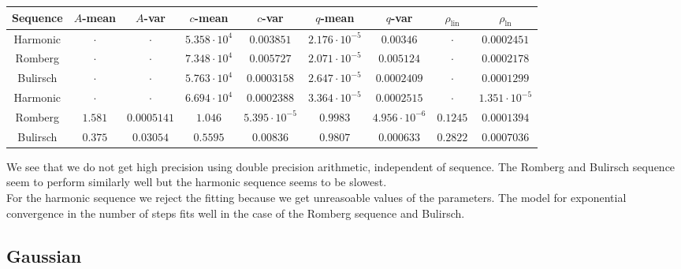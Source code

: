 \begin{table}[H]
    \centering
    \small
    \begin{tabular}{c||c|c|c|c|c|c|c|c}
Sequence & \(A\)-mean & \(A\)-var & \(c\)-mean & \(c\)-var & \(q\)-mean & \(q\)-var & \(\rho_{\operatorname{lin}}\) & \(\rho_{\ln}\)\\\hline
\rowcolor{red}
Harmonic & \(\cdot\) & \(\cdot\) & \(5.358\cdot 10^4\) & \(0.003851\) & \(2.176\cdot 10^{-5}\) & \(0.00346\) & \(\cdot\) & \(0.0002451\) \\
\rowcolor{red}
Romberg & \(\cdot\) & \(\cdot\) & \(7.348\cdot 10^4\) & \(0.005727\) & \(2.071\cdot 10^{-5}\) & \(0.005124\) & \(\cdot\) & \(0.0002178\) \\
\rowcolor{red}
Bulirsch & \(\cdot\) & \(\cdot\) & \(5.763\cdot 10^4\) & \(0.0003158\) & \(2.647\cdot 10^{-5}\) & \(0.0002409\) & \(\cdot\) & \(0.0001299\) \\
\rowcolor{red}
Harmonic & \(\cdot\) & \(\cdot\) & \(6.694\cdot 10^4\) & \(0.0002388\) & \(3.364\cdot 10^{-5}\) & \(0.0002515\) & \(\cdot\) & \(1.351\cdot 10^{-5}\) \\
\rowcolor{green}
Romberg & \(1.581\) & \(0.0005141\) & \(1.046\) & \(5.395\cdot 10^{-5}\) & \(0.9983\) & \(4.956\cdot 10^{-6}\) & \(0.1245\) & \(0.0001394\) \\
\rowcolor{green}
Bulirsch & \(0.375\) & \(0.03054\) & \(0.5595\) & \(0.00836\) & \(0.9807\) & \(0.000633\) & \(0.2822\) & \(0.0007036\) \\
    \end{tabular}
    \label{tab:my_label}
\end{table}

We see that we do not get high precision using double precision arithmetic, independent of sequence. The Romberg and Bulirsch sequence seem to perform similarly well but the harmonic sequence seems to be slowest.\\

For the harmonic sequence we reject the fitting because we get unreasoable values of the parameters. The model for exponential convergence in the number of steps fits well in the case of the Romberg sequence and Bulirsch.

\subsection{Gaussian}

